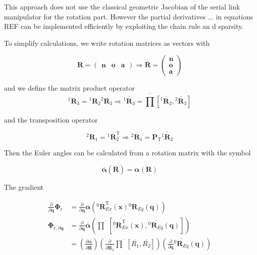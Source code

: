 \documentclass[twocolumn,10pt]{IFTOMM}
\newcommand{\bm}[1]{\boldsymbol{#1}}
\newcommand{\rotmat}[2]{{{ }^{#1}\boldsymbol{R}}_{#2}}
\newcommand{\transp}[0]{{\mathrm{T}}}
\begin{document}
This approach does not use the classical geometric Jacobian of the serial link manipulator for the rotation part.
However the partial derivatives ... in equations REF can be implemented efficiently by exploiting the chain rule an d sparsity.

To simplify calculations, we write rotation matrices as vectors with

\begin{equation}
\bm{R}=\begin{pmatrix}
\bm{n} & \bm{o} & \bm{a}
\end{pmatrix}
\Rightarrow
\overline{\bm{R}}=\begin{pmatrix}
\bm{n} \\ \bm{o} \\ \bm{a}
\end{pmatrix}
\end{equation}

and we define the matrix product operator
\begin{equation}
\rotmat{1}{3}
=
\rotmat{1}{2}
\rotmat{2}{3}
\Rightarrow
\overline{\rotmat{1}{3}}
=
\overline{\prod}\left[ \overline{\rotmat{1}{2}}, \overline{\rotmat{2}{3}}\right]
\end{equation}

and the transposition operator

\begin{equation}
\rotmat{2}{1}
=
\rotmat{1}{2}^\transp
\Rightarrow
\overline{\rotmat{2}{1}}
=
\bm{P}_\transp \overline{\rotmat{1}{2}}
\end{equation}

Then the Euler angles can be calculated from a rotation matrix with the symbol

\begin{equation}
\overline{\bm{\alpha}}(\overline{\bm{R}})
=
\bm{\alpha}(\bm{R})
\end{equation}

The gradient


\begin{align}
\frac{\partial}{\partial \bm{q}}\bm{\Phi}_{\mathrm{r}}
&=
\frac{\partial}{\partial \bm{q}} \bm{\alpha}\left(\rotmat{0}{Ex}^\transp(\bm{x}) \rotmat{0}{Eq}(\bm{q})\right) \nonumber \\
\bm{\Phi}_{\mathrm{r},\partial\bm{q}} 
&=
\frac{\partial}{\partial \bm{q}} \overline{\bm{\alpha}}\left(\overline{\prod}\left[ \overline{\rotmat{0}{Ex}^\transp}(\bm{x}), \overline{\rotmat{0}{Eq}}(\bm{q})\right]\right) \nonumber \\
&=
\left(\frac{\partial \overline{\bm{\alpha}}}{\partial \overline{\bm{R}}}\right)
\left(\frac{\partial }{\partial \overline{\bm{R}_2}}
\overline{\prod}\left[ \overline{R_1}, \overline{R_2}\right]\right)
\left(\frac{\partial}{\partial \bm{q}} \overline{\rotmat{0}{Eq}}(\bm{q})\right)  \nonumber
\end{align}
\end{document}
